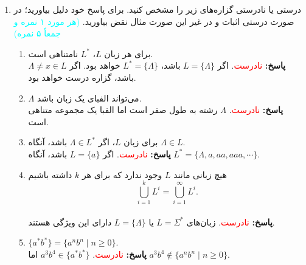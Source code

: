\documentclass{article}
\begin{document}
\begin{enumerate}
		\item 
		درستی یا نادرستی گزاره‌های زیر را مشخص کنید. برای پاسخ خود دلیل بیاورید؛ در صورت درستی اثبات و در غیر این صورت مثال نقض بیاورید. 
		\textcolor{cyan}{
		(هر مورد ۱ نمره و جمعاً ۵ نمره)
		}
		\begin{enumerate}
			\item 
			برای هر زبان $L$، 
			$L^*$
			نامتناهی است.
			\\
			\textbf{پاسخ:}
			\textcolor{red}{نادرست}.
			اگر
			$ L = \{\Lambda\} $
			باشد، 
			$ L^* = \{\Lambda\} $
			خواهد بود. اگر
			$\Lambda \neq x \in L$
			باشد، گزاره درست خواهد بود.
			\item 
			$\Lambda$
			می‌تواند الفبای یک زبان باشد.
				\\
			\textbf{پاسخ:}
			\textcolor{red}{نادرست}.
			$\Lambda$
			رشته به طول صفر است اما الفبا یک مجموعه متناهی است.
			\item 
			برای زبان $L$، اگر 
			$\Lambda \in L^*$
			باشد، آنگاه
			$\Lambda \in L$.
			\\
						\textbf{پاسخ:}
			\textcolor{red}{نادرست}. 
			اگر 
			$L = \{a\}$
			باشد، آنگاه
			$L^* = \{\Lambda, a, aa, aaa, \cdots\}$.
			\item 
			هیچ زبانی مانند $L$ وجود ندارد که برای هر $k$ داشته باشیم
			$$\bigcup_{i = 1}^{k} L^i = \bigcup_{i = 1}^{\infty} L^i.$$
				\\
			\textbf{پاسخ:}
			\textcolor{red}{نادرست}. 
			زبان‌های
			$L = \Sigma^*$
			یا
			$L = \{\Lambda\}$
 دارای این ویژگی هستند. 
			\item 
			$\{a^*b^*\} = \{a^nb^n \; | \; n \geq 0 \}$.
				\\
			\textbf{پاسخ:}
			\textcolor{red}{نادرست}. 
			$a^3b^4 \in \{a^*b^*\}$
			اما 
			$a^3b^4 \notin \{a^nb^n \; | \; n \geq 0 \}$.
		\end{enumerate}
	\end{enumerate}
\end{document}
